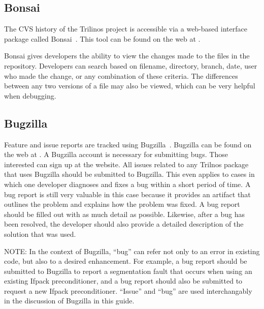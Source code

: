\documentclass[12pt,relax]{TrilinosDevGuide}
\begin{document}
\subsection{Bonsai}

The CVS history of the Trilinos project is accessible via a
web-based interface package called Bonsai~\cite{Bonsai}.  This tool can be 
found on the web at 
\newline
{}.  

\begin{minipage}[c]{\textwidth}

\begin{minipage}[l]{.6\textwidth}

Bonsai gives developers the ability to view the changes made to the files in 
the repository. Developers can search 
based on filename, directory, branch, date, user who made the 
change, or any combination of these criteria.  The differences between any two 
versions of a file may also be viewed, which can be very helpful when 
debugging.  
\end{minipage}\hfill
{}
\end{minipage}

\subsection{Bugzilla}
\label{subsect:Bugzilla}
Feature and issue reports are tracked using Bugzilla~\cite{Bugzilla}.  
Bugzilla can be found on the web at 
.  
A Bugzilla account is necessary for submitting bugs.  Those interested can 
sign up at the website.  All issues related to any Trilnos package that uses 
Bugzilla should be submitted to Bugzilla.  This even applies to cases in which 
one developer diagnoses and fixes a bug within a short period of time.  A bug 
report is still very valuable in this case because it provides an artifact 
that outlines the problem and explains how the problem was fixed.  A bug 
report should be filled out with as much detail as possible.  Likewise, after 
a bug has been resolved, the developer should also provide a detailed 
description of the solution that was used.

NOTE: In the context of Bugzilla, ``bug'' can refer not only to an error in 
existing code, but also to a desired enhancement.  For example, a bug report 
should be submitted to Bugzilla to report a segmentation fault that occurs 
when using an existing Ifpack preconditioner, and a bug report should also be
submitted to request a new Ifpack preconditioner.  ``Issue'' and ``bug'' are 
used interchangably in the discussion of Bugzilla in this guide.
\end{document}
